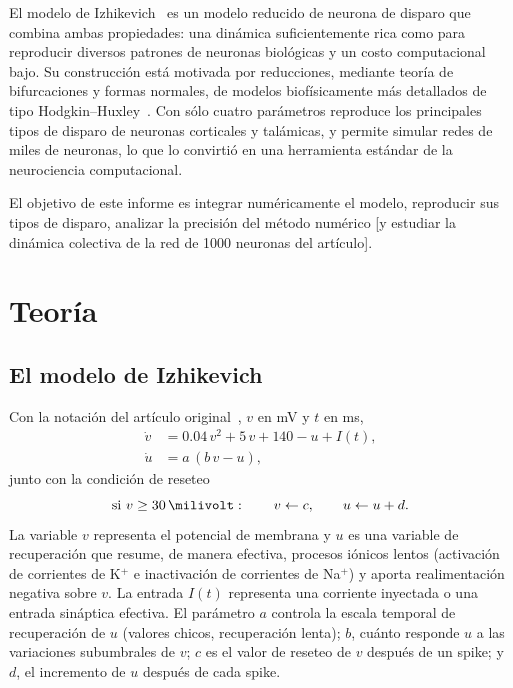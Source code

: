 \documentclass[10pt,a4paper,twocolumn]{article}
\begin{document}
El modelo de Izhikevich~\cite{izhikevich2003,izhikevich2007} es un modelo
reducido de neurona de disparo que combina ambas propiedades: una dinámica
suficientemente rica como para reproducir diversos patrones de neuronas
biológicas y un costo computacional bajo. Su construcción está motivada por
reducciones, mediante teoría de bifurcaciones y formas normales, de modelos
biofísicamente más detallados de tipo Hodgkin--Huxley~\cite{izhikevich2007}.
Con sólo cuatro parámetros reproduce los principales tipos de disparo de
neuronas corticales y talámicas, y permite simular redes de miles de neuronas,
lo que lo convirtió en una herramienta estándar de la neurociencia
computacional.

El objetivo de este informe es integrar numéricamente el modelo, reproducir
sus tipos de disparo, analizar la precisión del método numérico
[y estudiar la dinámica colectiva de la red de 1000 neuronas del artículo]. %

\section{Teoría}
\subsection{El modelo de Izhikevich}
Con la notación del artículo original~\cite{izhikevich2003}, $v$ en mV y $t$ en ms,
\begin{align}
  \dot v &= \num{0.04}\,v^2 + 5\,v + 140 - u + I(t), \label{eq:v}\\
  \dot u &= a\,(b\,v - u), \label{eq:u}
\end{align}
junto con la condición de reseteo
\begin{equation}
  \text{si } v \geq \SI{30}{\milivolt}: \qquad v \leftarrow c, \qquad u \leftarrow u + d .
  \label{eq:reset}
\end{equation}
La variable $v$ representa el potencial de membrana y $u$ es una variable de
recuperación que resume, de manera efectiva, procesos iónicos lentos (activación
de corrientes de K$^+$ e inactivación de corrientes de Na$^+$) y aporta
realimentación negativa sobre $v$. La entrada $I(t)$ representa una corriente
inyectada o una entrada sináptica efectiva. El parámetro $a$ controla la escala
temporal de recuperación de $u$ (valores chicos, recuperación lenta); $b$, cuánto
responde $u$ a las variaciones subumbrales de $v$; $c$ es el valor de reseteo de
$v$ después de un spike; y $d$, el incremento de $u$ después de cada spike.
\end{document}
